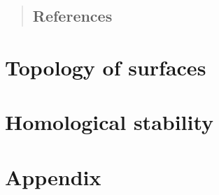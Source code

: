 

\setmainlanguage[variant=british]{english}
\newcommand{\fach}{Mapping Class Groups, Homological Stability and Madsen-Weiss-Theory}
\newcommand{\shortFach}{Madsen-Weiss-Theory}
\newcommand{\semester}{Wise 2016}
\newcommand{\homepage}{https://wwwmath.uni-muenster.de/reine/u/topos/lehre/WS2015-2016/Topologie2/}

\newcommand{\prof}{Prof.\ Dr.\ Johannes Ebert}
\publishers{}



\maketitle
\begin{abstract}

\section*{References}

\end{abstract}

\tableofcontents
\cleardoubleoddemptypage

\setcounter{page}{1}
\setcounter{footnote}{0}




\chapter{Topology of surfaces}



\chapter{Homological stability} %
\label{cha:homological_stability}





\cleardoubleoddemptypage
{}
\setcounter{page}{1}
\cleardoubleoddemptypage
\appendix

\chapter{Appendix} %
\label{chap:appendix}

\printindex
\printbibliography
\listoffigures
\todototoc\listoftodos
